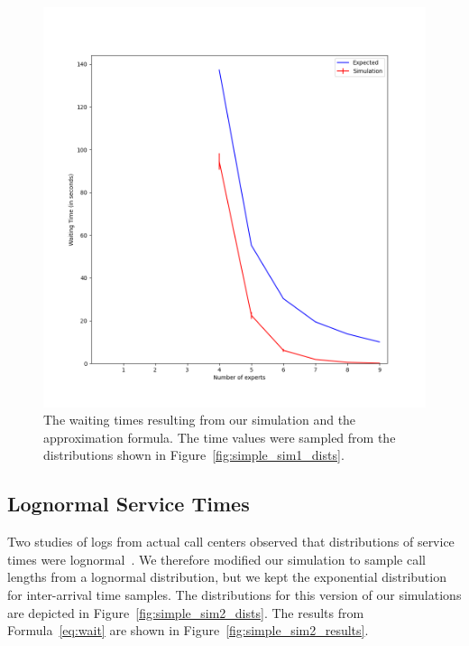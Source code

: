 \begin{figure}[h]
  \includegraphics[width=\textwidth]{figures/montecarlo/independent_calls_expon.png}
  \caption{
    The waiting times resulting from our simulation and the approximation
    formula.
    The time values were sampled from the distributions shown in
    Figure~\ref{fig:simple_sim1_dists}.
  }\label{fig:simple_sim1_results}
\end{figure}

\subsection{Lognormal Service Times}

Two studies of logs from actual call centers observed that distributions of
service times were lognormal~\cite{queue1, queue2}.
We therefore modified our simulation to sample call lengths from a lognormal
distribution, but we kept the exponential distribution for inter-arrival time
samples.
The distributions for this version of our simulations are depicted in
Figure~\ref{fig:simple_sim2_dists}.
The results from Formula~\ref{eq:wait} are shown in
Figure~\ref{fig:simple_sim2_results}.

